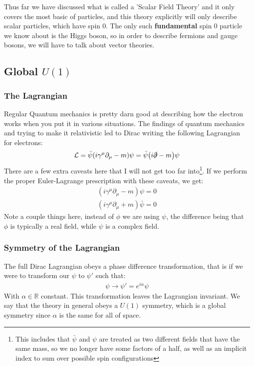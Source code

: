 \documentclass[12pt]{article}
\renewcommand{\L}{\mathcal{L}}
\newcommand{\D}{\partial}
\newcommand{\psib}{\bar{\psi}}
\newcommand{\sla}[1]{\slashed{#1}}
\begin{document}
Thus far we have discussed what is called a 'Scalar Field Theory' and it only covers the most basic of particles, and this theory explicitly will only describe scalar particles, which have spin 0. The only such \textbf{fundamental} spin 0 particle we know about is the Higgs boson, so in order to describe fermions and gauge bosons, we will have to talk about vector theories.

\subsection{Global $U(1)$}

\subsubsection{The Lagrangian}
Regular Quantum mechanics is pretty darn good at describing how the electron works when you put it in various situations. The findings of quantum mechanics and trying to make it relativistic led to Dirac writing the following Lagrangian for electrons:
\begin{align*}
  \L=\psib\qty(i\gamma^\mu\D_\mu-m)\psi=\psib\qty(i\sla\D-m)\psi
\end{align*}
There are a few extra caveats here that I will not get too far into\footnote{This includes that $\psib$ and $\psi$ are treated as two different fields that have the same mass, so we no longer have some factors of a half, as well as an implicit index to sum over possible spin configurations}. If we perform the proper Euler-Lagrange prescription with these caveats, we get:
\begin{align*}
  (i\gamma^\mu\D_\mu-m)\psi=0\\
  (i\gamma^\mu\D_\mu+m)\psib=0
\end{align*}
Note a couple things here, instead of $\phi$ we are using $\psi$, the difference being that $\phi$ is typically a real field, while $\psi$ is a complex field.
\subsubsection{Symmetry of the Lagrangian}
The full Dirac Lagrangian obeys a phase difference transformation, that is if we were to transform our $\psi$ to $\psi'$ such that:
\begin{align*}
  \psi\to\psi'=e^{i\alpha}\psi
\end{align*}
With $\alpha\in\mathbb{R}$ constant. This transformation leaves the Lagrangian invariant. We say that the theory in general obeys a $U(1)$ symmetry, which is a global symmetry since $\alpha$ is the same for all of space.
\end{document}
